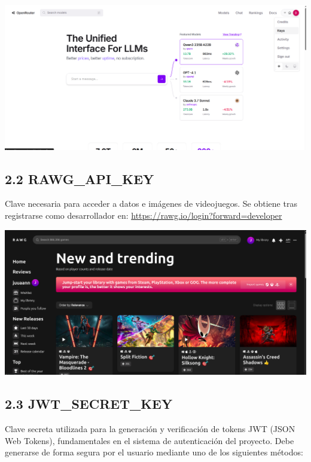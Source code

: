 \begin{center}
	\includegraphics[width=1\textwidth]{imagenes/openRouter.png}
\end{center}

\subsection*{2.2 RAWG\_API\_KEY}
Clave necesaria para acceder a datos e imágenes de videojuegos. Se obtiene tras registrarse como desarrollador en:  
\url{https://rawg.io/login?forward=developer}

\begin{center}
	\includegraphics[width=1\textwidth]{imagenes/rawg.png}
\end{center}

\subsection*{2.3 JWT\_SECRET\_KEY}
Clave secreta utilizada para la generación y verificación de tokens JWT (JSON Web Tokens), fundamentales en el sistema de autenticación del proyecto. Debe generarse de forma segura por el usuario mediante uno de los siguientes métodos:

